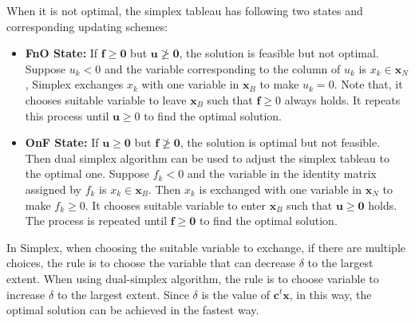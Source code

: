 \documentclass[letterpaper]{article}
\begin{document}

When it is not optimal, the simplex tableau has following two states and corresponding updating schemes:
\begin{itemize}
\item \textbf{FnO State:} If $\mathbf{f} \geq \mathbf{0}$ but $\mathbf{u} \ngeq \mathbf{0}$, the solution is feasible but not optimal. %
Suppose $u_k < 0$ and the variable corresponding to the column of $u_k$ is $x_k \in \mathbf{x}_{N}$, Simplex exchanges $x_k$ with one variable in $\mathbf{x}_B$ to make $u_k = 0$. Note that, it chooses suitable variable to leave $\mathbf{x}_B$ such that $\mathbf{f} \geq 0$ always holds. It repeats this process until $\mathbf{u} \geq 0$ to find the optimal solution.
\item \textbf{OnF State:} If $\mathbf{u} \geq \mathbf{0}$ but $\mathbf{f} \ngeq \mathbf{0}$, the solution is optimal but not feasible. Then dual simplex algorithm can be used to adjust the simplex tableau to the optimal one. Suppose $f_k < 0$ and the variable in the identity matrix assigned by $f_k$ is $x_k \in \mathbf{x}_B$. Then $x_k$ is exchanged with one variable in $\mathbf{x}_N$ to make $f_k \geq 0$. It chooses suitable variable to enter $\mathbf{x}_B$ such that $\mathbf{u} \geq \mathbf{0}$ holds. The process is repeated until $\mathbf{f} \geq \mathbf{0}$ to find the optimal solution.
\end{itemize}

In Simplex, when choosing the suitable variable to exchange, if there are multiple choices, the rule is to choose the variable that can decrease $\delta$ to the largest extent. When using dual-simplex algorithm, the rule is to choose variable to increase $\delta$ to the largest extent. Since $\delta$ is the value of $\mathbf{c}^t\mathbf{x}$, in this way, the optimal solution can be achieved in the fastest way.
\end{document}
